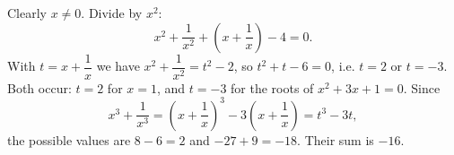Clearly $x\ne0$. Divide by $x^2$:
\[x^2+\dfrac1{x^2}+\left(x+\dfrac1x\right)-4=0.\]
With $t=x+\dfrac1x$ we have $x^2+\dfrac1{x^2}=t^2-2$, so $t^2+t-6=0$, i.e. $t=2$ or $t=-3$. Both occur: $t=2$ for $x=1$, and $t=-3$ for the roots of $x^2+3x+1=0$. Since
\[x^3+\dfrac1{x^3}=\left(x+\dfrac1x\right)^3-3\left(x+\dfrac1x\right)=t^3-3t,\]
the possible values are $8-6=2$ and $-27+9=-18$. Their sum is $\boxed{-16}$.
